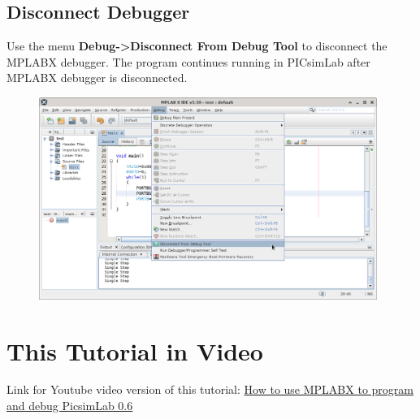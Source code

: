 \subsection{Disconnect Debugger}
Use the menu \textbf{Debug->Disconnect From Debug Tool} to disconnect the MPLABX debugger. The program continues running in PICsimLab after MPLABX debugger is disconnected.
\begin{figure}[H]
\center
\includegraphics[width=0.98\textwidth]{img/hmd/mplab31.png} 
\end{figure} 

\section{This Tutorial in Video}

Link for Youtube video version of this tutorial: \href{https://youtu.be/q2oZB50Avm4}{How to use MPLABX to program and debug PicsimLab 0.6}


